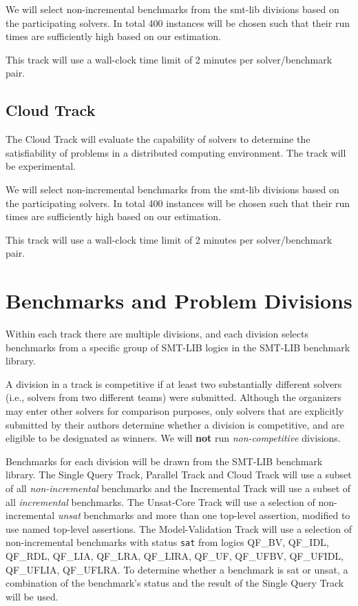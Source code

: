 \documentclass[12pt]{article}
\newcommand{\maintrack}{Single Query Track\xspace}
\newcommand{\inctrack}{Incremental Track\xspace}
\newcommand{\ucoretrack}{Unsat-Core Track\xspace}
\newcommand{\mvaltrack}{Model-Validation Track\xspace}
\newcommand{\challtrack}{Industry-Challenge Track\xspace}
\newcommand{\paralleltrack}{Parallel Track\xspace}
\newcommand{\cloudtrack}{Cloud Track\xspace}
\begin{document}
We will select non-incremental benchmarks from the smt-lib divisions
based on the participating solvers.  In total 400 instances will be
chosen such that their run times are sufficiently high based on our
estimation.

This track will use a wall-clock time limit of 2 minutes per
solver/benchmark pair.

\subsection{\cloudtrack{}}
The \cloudtrack{} will evaluate the capability of solvers to determine
the satisfiability of problems in a distributed computing environment.
The track will be experimental.

We will select non-incremental benchmarks from the smt-lib divisions
based on the participating solvers.  In total 400 instances will be
chosen such that their run times are sufficiently high based on our
estimation.

This track will use a wall-clock time limit of 2 minutes per
solver/benchmark pair.

\section{Benchmarks and Problem Divisions}

%
Within each track there are multiple divisions, and each division selects
benchmarks from a specific group of SMT-LIB logics in the SMT-LIB benchmark
library.

A division in a track is competitive if at least two substantially
different solvers (i.e., solvers from two different teams) were
submitted.  Although the organizers may enter other solvers for
comparison purposes, only solvers that are explicitly submitted by
their authors determine whether a division is competitive, and are
eligible to be designated as winners.
We will \textbf{not} run \emph{non-competitive} divisions.

Benchmarks for each division will be drawn from the SMT-LIB benchmark
library.  The \maintrack, \paralleltrack{} and \cloudtrack{} will use a
subset of all \emph{non-incremental} benchmarks and the \inctrack will
use a subset of all \emph{incremental} benchmarks.
%
%
The \ucoretrack will use a selection of non-incremental
\emph{unsat} benchmarks
and more than one top-level assertion, modified to use named
top-level assertions.  The \mvaltrack will use a selection of non-incremental
benchmarks with status \texttt{sat} from logics QF\_BV, QF\_IDL, QF\_RDL,
QF\_LIA, QF\_LRA, QF\_LIRA, QF\_UF, QF\_UFBV, QF\_UFIDL, QF\_UFLIA, QF\_UFLRA.
To determine whether a benchmark is sat or unsat, a combination of
the benchmark's status and the result of the \maintrack{} will be used.
\end{document}
